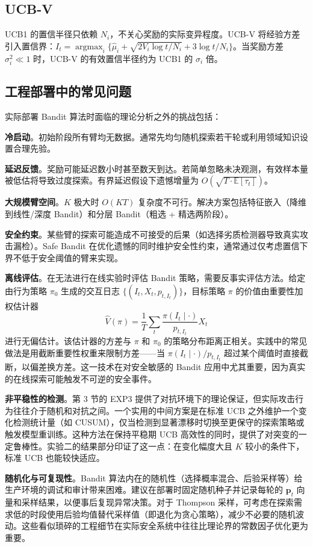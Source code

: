 \documentclass[UTF8,a4paper,11pt,zihao=5]{ctexart}
\newcommand{\E}{\mathbb{E}}
\newcommand{\argmax}{\mathop{\arg\max}}
\begin{document}
\subsection{UCB-V}

UCB1 的置信半径只依赖 $N_i$，不关心奖励的实际变异程度。UCB-V 将经验方差引入置信界：$I_t = \argmax_i \{\hat{\mu}_i + \sqrt{2V_i \log t / N_i} + 3\log t / N_i\}$。当奖励方差 $\sigma_i^2 \ll 1$ 时，UCB-V 的有效置信半径约为 UCB1 的 $\sigma_i$ 倍。

\subsection{工程部署中的常见问题}

实际部署 Bandit 算法时面临的理论分析之外的挑战包括：

\textbf{冷启动}。初始阶段所有臂均无数据。通常先均匀随机探索若干轮或利用领域知识设置合理先验。

\textbf{延迟反馈}。奖励可能延迟数小时甚至数天到达。若简单忽略未决观测，有效样本量被低估将导致过度探索。有界延迟假设下遗憾增量为 $O(\sqrt{T \cdot \E[\tau_t]})$。

\textbf{大规模臂空间}。$K$ 极大时 $O(KT)$ 复杂度不可行。解决方案包括特征嵌入（降维到线性/深度 Bandit）和分层 Bandit（粗选 + 精选两阶段）。

\textbf{安全约束}。某些臂的探索可能造成不可接受的后果（如选择劣质检测器导致真实攻击漏检）。Safe Bandit 在优化遗憾的同时维护安全性约束，通常通过仅考虑置信下界不低于安全阈值的臂来实现。

\textbf{离线评估}。在无法进行在线实验时评估 Bandit 策略，需要反事实评估方法。给定由行为策略 $\pi_0$ 生成的交互日志 $\{(I_t, X_t, p_{t,I_t})\}$，目标策略 $\pi$ 的价值由重要性加权估计器
\[
\hat{V}(\pi) = \frac{1}{T} \sum_t \frac{\pi(I_t\mid\cdot)}{p_{t,I_t}} X_t
\]
进行无偏估计。该估计器的方差与 $\pi$ 和 $\pi_0$ 的策略分布距离正相关。实践中的常见做法是用截断重要性权重来限制方差——当 $\pi(I_t\mid\cdot)/p_{t,I_t}$ 超过某个阈值时直接截断，以偏差换方差。这一技术在对安全敏感的 Bandit 应用中尤其重要，因为真实的在线探索可能触发不可逆的安全事件。

\textbf{非平稳性的检测}。第 3 节的 EXP3 提供了对抗环境下的理论保证，但实际攻击行为往往介于随机和对抗之间。一个实用的中间方案是在标准 UCB 之外维护一个变化检测统计量（如 CUSUM），仅当检测到显著漂移时切换至更保守的探索策略或触发模型重训练。这种方法在保持平稳期 UCB 高效性的同时，提供了对突变的一定鲁棒性。实验二的结果部分印证了这一点：在变化幅度大且 $K$ 较小的条件下，标准 UCB 也能较快适应。

\textbf{随机化与可复现性}。Bandit 算法内在的随机性（选择概率混合、后验采样等）给生产环境的调试和审计带来困难。建议在部署时固定随机种子并记录每轮的 $\bm{p}_t$ 向量和采样结果，以便事后复现异常决策。对于 Thompson 采样，可考虑在探索需求低的时段使用后验均值替代采样值（即退化为贪心策略），减少不必要的随机波动。这些看似琐碎的工程细节在实际安全系统中往往比理论界的常数因子优化更为重要。
\end{document}
